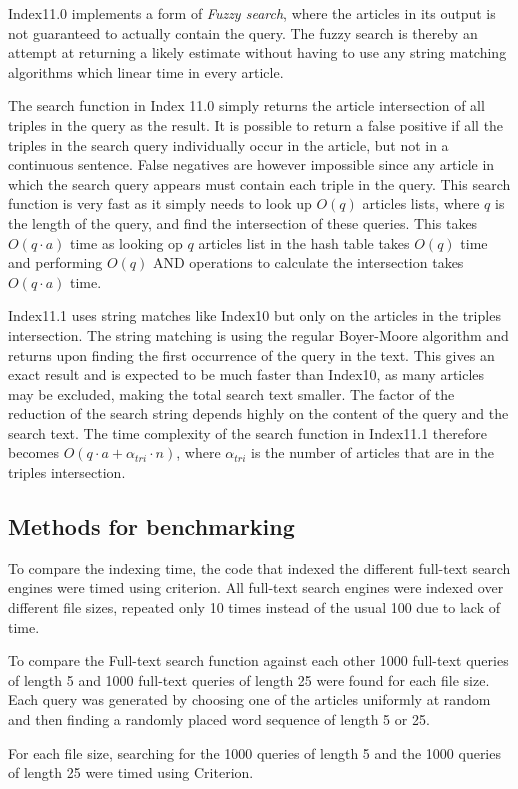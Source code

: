 Index11.0 implements a form of \textit{Fuzzy search}, where the articles in its output is not guaranteed to actually contain the query. The fuzzy search is thereby an attempt at returning a likely estimate without having to use any string matching algorithms which linear time in every article. 

The search function in Index 11.0 simply returns the article intersection of all triples in the query as the result. It is possible to return a false positive if all the triples in the search query individually occur in the article, but not in a continuous sentence. False negatives are however impossible since any article in which the search query appears must contain each triple in the query. This search function is very fast as it simply needs to look up $O(q)$ articles lists, where $q$ is the length of the query, and find the intersection of these queries. This takes $O(q\cdot a)$ time as looking op $q$ articles list in the hash table takes $O(q)$ time and performing $O(q)$ AND operations to calculate the intersection takes $O(q\cdot a)$ time.

Index11.1 uses string matches like Index10 but only on the articles in the triples intersection. The string matching is using the regular Boyer-Moore algorithm and returns upon finding the first occurrence of the query in the text. This gives an exact result and is expected to be much faster than Index10, as many articles may be excluded, making the total search text smaller. The factor of the reduction of the search string depends highly on the content of the query and the search text. The time complexity of the search function in Index11.1 therefore becomes $O(q\cdot a + \alpha_{tri}\cdot n)$, where $\alpha_{tri}$ is the number of articles that are in the triples intersection. 

\subsection{Methods for benchmarking}
To compare the indexing time, the code that indexed the different full-text search engines were timed using criterion. All full-text search engines were indexed over different file sizes, repeated only 10 times instead of the usual 100 due to lack of time.

To compare the Full-text search function against each other 1000 full-text queries of length 5 and 1000 full-text queries of length 25  were found for each file size. Each query was generated by choosing one of the articles uniformly at random and then finding a randomly placed word sequence of length 5 or 25. 

For each file size, searching for the 1000 queries of length 5 and the 1000 queries of length 25 were timed using Criterion.

